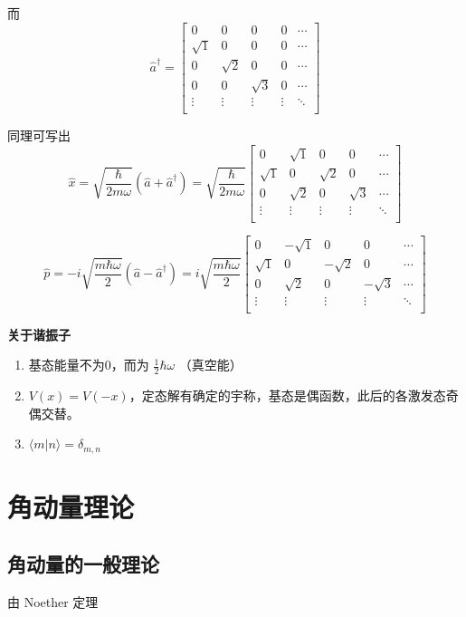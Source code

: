 \documentclass[lang=cn,10pt]{elegantbook}
\begin{document}
而
\[
\hat{a}^\dagger = \begin{bmatrix}
	0 & 0 & 0 & 0 & \cdots \\
	\sqrt{1} & 0 & 0 & 0 & \cdots \\
	0 & \sqrt{2} & 0 & 0 & \cdots \\
	0 & 0 & \sqrt{3} & 0 & \cdots \\
	\vdots & \vdots & \vdots & \vdots & \ddots \\
\end{bmatrix}
\]

同理可写出
\[
\hat{x} = \sqrt{\frac{\hbar}{2m\omega}} (\hat{a} + \hat{a}^\dagger) = \sqrt{\frac{\hbar}{2m\omega}} \begin{bmatrix}
	0 & \sqrt{1} & 0 & 0 & \cdots \\
	\sqrt{1} & 0 & \sqrt{2} & 0 & \cdots \\
	0 & \sqrt{2} & 0 & \sqrt{3} & \cdots \\
	\vdots & \vdots & \vdots & \vdots & \ddots \\
\end{bmatrix}
\]

\[
\hat{p} = -i \sqrt{\frac{m\hbar \omega}{2}} (\hat{a} - \hat{a}^\dagger) = i \sqrt{\frac{m\hbar \omega}{2}} \begin{bmatrix}
	0 & -\sqrt{1} & 0 & 0 & \cdots \\
	\sqrt{1} & 0 & -\sqrt{2} & 0 & \cdots \\
	0 & \sqrt{2} & 0 & -\sqrt{3} & \cdots \\
	\vdots & \vdots & \vdots & \vdots & \ddots \\
\end{bmatrix}
\]

\textbf{关于谐振子}
\begin{enumerate}
	\item 基态能量不为0，而为 \(\frac{1}{2} \hbar \omega\) （真空能）
	\item \(V(x) = V(-x)\)，定态解有确定的宇称，基态是偶函数，此后的各激发态奇偶交替。
	\item \(\langle m | n \rangle = \delta_{m,n}\)
\end{enumerate}
\chapter{角动量理论}
\section{角动量的一般理论}
由 Noether 定理
\end{document}
